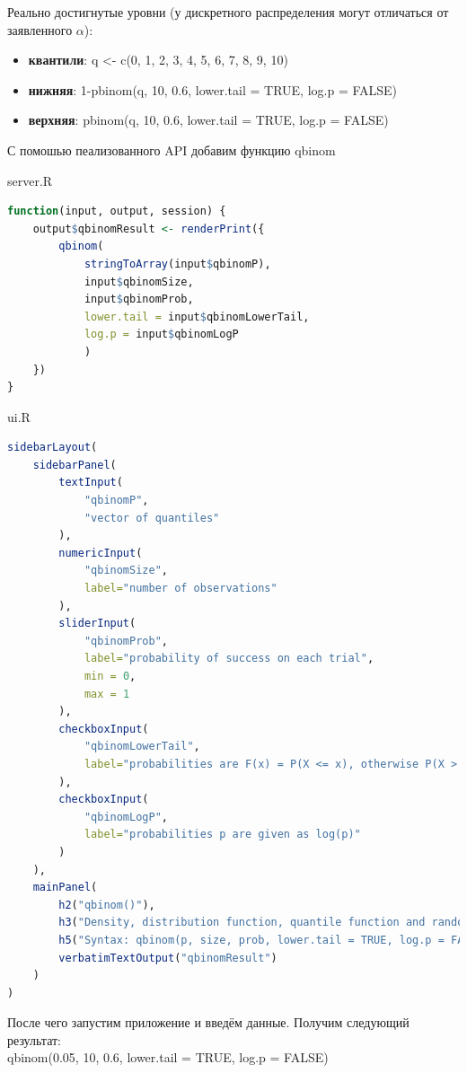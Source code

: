 \documentclass[14pt,a4paper]{scrartcl}
\begin{document}
	Реально достигнутые уровни (у дискретного распределения могут отличаться от заявленного $\alpha$):
    \begin{itemize}
        \item \textbf{квантили}: q <- c(0, 1, 2, 3, 4, 5, 6, 7, 8, 9, 10)
        \item \textbf{нижняя}: 1-pbinom(q, 10, 0.6, lower.tail = TRUE, log.p = FALSE)
        \item \textbf{верхняя}: pbinom(q, 10, 0.6, lower.tail = TRUE, log.p = FALSE)
    \end{itemize}

	С помошью пеализованного API добавим функцию qbinom

    server.R
    \begin{lstlisting}[language=R]
function(input, output, session) {
    output$qbinomResult <- renderPrint({
        qbinom(
            stringToArray(input$qbinomP),
            input$qbinomSize,
            input$qbinomProb,
            lower.tail = input$qbinomLowerTail,
            log.p = input$qbinomLogP
            )
    })
}
    \end{lstlisting}

    ui.R
    \begin{lstlisting}[language=R]
sidebarLayout(
    sidebarPanel(
        textInput(
            "qbinomP",
            "vector of quantiles"
        ),
        numericInput(
            "qbinomSize",
            label="number of observations"
        ),
        sliderInput(
            "qbinomProb",
            label="probability of success on each trial",
            min = 0,
            max = 1
        ),
        checkboxInput(
            "qbinomLowerTail",
            label="probabilities are F(x) = P(X <= x), otherwise P(X > x) = 1 --- F(x)."
        ),
        checkboxInput(
            "qbinomLogP",
            label="probabilities p are given as log(p)"
        )
    ),
    mainPanel(
        h2("qbinom()"),
        h3("Density, distribution function, quantile function and random generation for the binomial distribution with parameters size and prob"),
        h5("Syntax: qbinom(p, size, prob, lower.tail = TRUE, log.p = FALSE)."),
        verbatimTextOutput("qbinomResult")
    )
)
    \end{lstlisting}

    \newpage
    После чего запустим приложение и введём данные. Получим следующий результат:\\

    qbinom(0.05, 10, 0.6, lower.tail = TRUE, log.p = FALSE)\\
    
\end{document}

